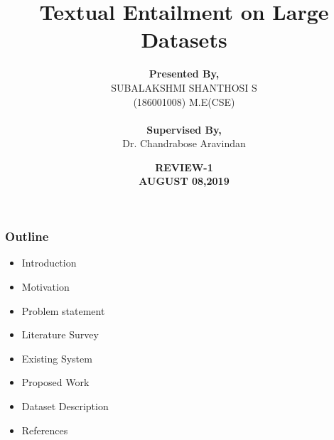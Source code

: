 \documentclass{beamer}
\begin{document}
\title{\textbf{Textual Entailment on Large Datasets} }

\author{ \textbf{ Presented By,}\\  SUBALAKSHMI SHANTHOSI S \\(186001008) M.E(CSE) \\~\\  \textbf{Supervised By,} \\ Dr. Chandrabose Aravindan}
\date{\textbf{REVIEW-1 \\ AUGUST 08,2019} }


\begin{frame}
\titlepage
\end{frame}


\begin{frame}\frametitle{Outline}
\begin{itemize}
\item Introduction
\item Motivation
\item Problem statement
\item Literature Survey
\item Existing System
\item Proposed Work
\item Dataset Description
\item References
\end{itemize}
\end{frame}
\end{document}
